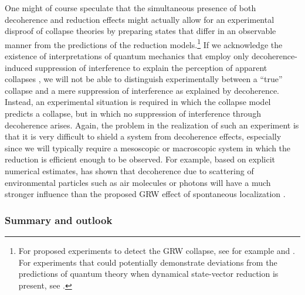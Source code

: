 \documentclass[rmp,aps,amsmath,amsfonts,noshowkeys,noshowpacs,12pt]{revtex4}
\newcommand{\cf}{cf.\ }
\begin{document}
One might of course speculate that the simultaneous presence of both
decoherence and reduction effects might actually allow for an
experimental disproof of collapse theories by preparing states that
differ in an observable manner from the predictions of the reduction
models.\footnote{For proposed experiments to detect the GRW collapse,
  see for example \citet{Squires:1991:az} and \citet{Rae:1990:wa}. For
  experiments that could potentially demonstrate deviations from the
  predictions of quantum theory when dynamical state-vector reduction
  is present, see \citet{Pearle:1984:qz,Pearle:1986:po}.} If we
acknowledge the existence of interpretations of quantum mechanics that
employ only decoherence-induced suppression of interference to explain
the perception of apparent collapses \citetext{as is, for example,
  claimed by the ``existential interpretation'' of
  \citealp{Zurek:1993:pu,Zurek:1998:re}; see
  Sec.~\ref{sec:exist-interpret}}, we will not be able to distinguish
experimentally between a ``true'' collapse and a mere suppression of
interference as explained by decoherence.  Instead, an experimental
situation is required in which the collapse model predicts a collapse,
but in which no suppression of interference through decoherence
arises. Again, the problem in the realization of such an experiment is
that it is very difficult to shield a system from decoherence effects,
especially since we will typically require a mesoscopic or macroscopic
system in which the reduction is efficient enough to be observed.  For
example, based on explicit numerical estimates,
\citet{Tegmark:1993:uz} has shown that decoherence due to scattering
of environmental particles such as air molecules or photons will have
a much stronger influence than the proposed GRW effect of spontaneous
localization \citetext{see also
  \citealp{Bassi:2003:yb,Benatti:1995:re}; for different results for
  energy-driven reduction models, \cf \citealp{Adler:2002:rc}}.

\subsubsection{Summary and outlook} 
\end{document}
